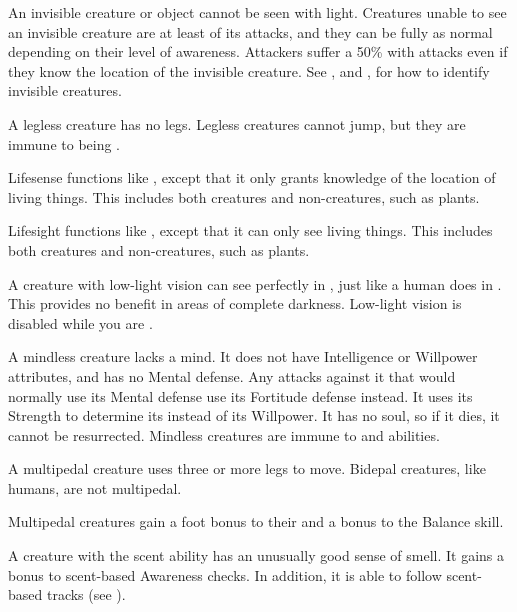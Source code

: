   An invisible creature or object cannot be seen with light.
  Creatures unable to see an invisible creature are at least \partiallyunaware of its attacks, and they can be fully \unaware as normal depending on their level of awareness.
  Attackers suffer a 50\%  with  attacks even if they know the location of the invisible creature.
  See , and , for how to identify invisible creatures.

  A legless creature has no legs.
  Legless creatures cannot jump, but they are immune to being \prone.

  Lifesense functions like , except that it only grants knowledge of the location of living things.
  This includes both creatures and non-creatures, such as plants.

  Lifesight functions like , except that it can only see living things.
  This includes both creatures and non-creatures, such as plants.

  A creature with low-light vision can see perfectly in , just like a human does in .
  This provides no benefit in areas of complete darkness.
  Low-light vision is disabled while you are \dazzled.

  A mindless creature lacks a mind.
  It does not have Intelligence or Willpower attributes, and has no Mental defense.
  Any attacks against it that would normally use its Mental defense use its Fortitude defense instead.
  It uses its Strength to determine its  instead of its Willpower.
  It has no soul, so if it dies, it cannot be resurrected.
  Mindless creatures are immune to  and  abilities.

  A multipedal creature uses three or more legs to move.
  Bidepal creatures, like humans, are not multipedal.

  Multipedal creatures gain a  foot bonus to their  and a  bonus to the Balance skill.

  A creature with the scent ability has an unusually good sense of smell.
  It gains a  bonus to scent-based Awareness checks.
  In addition, it is able to follow scent-based tracks (see ).

